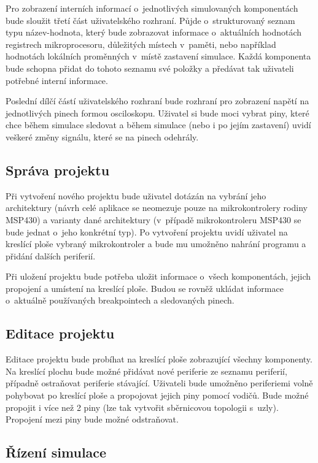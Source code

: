 Pro zobrazení interních informací o~jednotlivých simulovaných komponentách bude sloužit třetí část uživatelského rozhraní. Půjde o~strukturovaný seznam
typu název-hodnota, který bude zobrazovat informace o~aktuálních hodnotách registrech mikroprocesoru, důležitých místech v~paměti, nebo například hodnotách
lokálních proměnných v~místě zastavení simulace. Každá komponenta bude schopna přidat do tohoto seznamu své položky a předávat tak uživateli potřebné
interní informace.

Poslední dílčí částí uživatelského rozhraní bude rozhraní pro zobrazení napětí na jednotlivých pinech formou osciloskopu. Uživatel si bude moci vybrat
piny, které chce během simulace sledovat a během simulace (nebo i po jejím zastavení) uvidí veškeré změny signálu, které se na pinech odehrály.

\subsection{Správa projektu}

Při vytvoření nového projektu bude uživatel dotázán na vybrání jeho architektury (návrh celé aplikace se neomezuje pouze na mikrokontrolery rodiny MSP430) a varianty dané architektury (v~případě mikrokontroleru MSP430 se bude jednat o~jeho konkrétní typ). Po vytvoření projektu uvidí uživatel na kreslící ploše vybraný mikrokontroler a bude mu umožněno nahrání programu a přidání dalších periferií.

Při uložení projektu bude potřeba uložit informace o~všech komponentách, jejich propojení a umístení na kreslící ploše. Budou se rovněž ukládat informace
o~aktuálně používaných breakpointech a sledovaných pinech.

\subsection{Editace projektu}

Editace projektu bude probíhat na kreslící ploše zobrazující všechny komponenty. Na kreslící plochu bude možné přidávat nové periferie ze seznamu periferií, případně ostraňovat periferie stávající. Uživateli bude umožněno periferiemi volně pohybovat po kreslící ploše a propojovat jejich piny pomocí vodičů. Bude možné propojit i více než 2 piny (lze tak vytvořit sběrnicovou topologii s~uzly). Propojení mezi piny bude možné odstraňovat.

\subsection{Řízení simulace}

